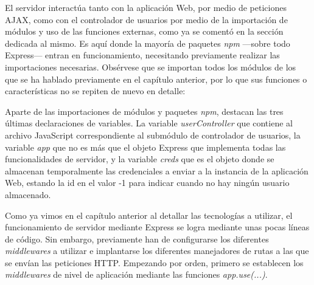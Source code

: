 El servidor interactúa tanto con la aplicación Web, por medio de peticiones AJAX, como con el controlador de usuarios por medio de la importación de módulos y uso de las funciones externas, como ya se comentó en la sección dedicada al mismo. Es aquí donde la mayoría de paquetes \emph{npm} —sobre todo Express— entran en funcionamiento, necesitando previamente realizar las importaciones necesarias. Obsérvese que se importan todos los módulos de los que se ha hablado previamente en el capítulo anterior, por lo que sus funciones o características no se repiten de nuevo en detalle:


Aparte de las importaciones de módulos y paquetes \emph{npm}, destacan las tres últimas declaraciones de variables. La variable \emph{userController} que contiene al archivo JavaScript correspondiente al submódulo de controlador de usuarios, la variable \emph{app} que no es más que el objeto Express que implementa todas las funcionalidades de servidor, y la variable \emph{creds} que es el objeto donde se almacenan temporalmente las credenciales a enviar a la instancia de la aplicación Web, estando la id en el valor -1 para indicar cuando no hay ningún usuario almacenado.

Como ya vimos en el capítulo anterior al detallar las tecnologías a utilizar, el funcionamiento de servidor mediante Express se logra mediante unas pocas líneas de código. Sin embargo, previamente han de configurarse los diferentes \emph{middlewares} a utilizar e implantarse los diferentes manejadores de rutas a las que se envían las peticiones HTTP. Empezando por orden, primero se establecen los \emph{middlewares} de nivel de aplicación mediante las funciones \emph{app.use(...)}.

